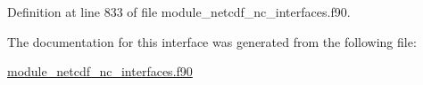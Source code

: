 Definition at line 833 of file module\+\_\+netcdf\+\_\+nc\+\_\+interfaces.\+f90.



The documentation for this interface was generated from the following file\+:\begin{DoxyCompactItemize}
\item 
\hyperlink{module__netcdf__nc__interfaces_8f90}{module\+\_\+netcdf\+\_\+nc\+\_\+interfaces.\+f90}\end{DoxyCompactItemize}
